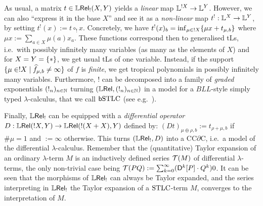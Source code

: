 \documentclass[submission,%
]{eptcs}
\begin{document}
 As usual, a matrix $t\in{\mathbb{L}\mathsf{Rel}_!}(X,Y)$ yields a \emph{linear} map $\mathbb{L}^{!X}\to\mathbb{L}^Y$. However, we can also ``express it in the base $X$'' and see it as a \emph{non-linear} map $t^!:\mathbb{L}^X\to\mathbb{L}^Y$, by setting 
 $t^!(x):=t\circ_! x$.
 Concretely, we have $t^!(x)_b=\inf_{\mu\in !X} \{\mu x+ t_{\mu,b}\}$
 where $\mu x:=\sum_{a\in X} \mu(a)x_a$.
 These functions correspond then to generalised tLs, i.e.\ with possibly infinitely many variables (as many as the elements of $X$) and for $X=Y=\{*\}$, we get usual tLs of one variable.
Instead, if the support $\{\mu\in!X\mid\widehat{f}_{\mu,b}\neq\infty\}$ of $f$ is \emph{finite}, we get %
tropical polynomials in possibly infinitely many variables.
Furthermore, $!$ can be decomposed into a family of \emph{graded} exponentials $(!_n)_{n\in\mathbb{N}}$ turning $(\mathbb{L} \mathsf{Rel},(!_n)_{n\in\mathbb{N}})$ in a model for a $\mathit{BLL}$-style simply typed $\lambda$-calculus, that we call $\mathsf b\mathrm{STLC}$ (see e.g.~\cite{Brunel2014}).

 
Finally, $\mathbb{L} \mathsf{Rel}_!$ can be equipped with a \emph{differential operator} $D:{\mathbb{L} \mathsf{Rel}}(!X,Y)\to {\mathbb{L}\mathsf{Rel}}(!(X+X),Y)$ defined by: $(Dt)_{\mu\oplus\rho,b}:=t_{\rho+\mu,b}$ if $\#\mu=1$ and $:=\infty$ otherwise. %
This turns $(\mathbb{L} \mathsf{Rel}_!,D)$ into a CC$\partial$C, i.e.\ a model of the differential $\lambda$-calculus.
Remember that the (quantitative) Taylor expansion of an ordinary $\lambda$-term $M$ is an inductively defined series $\mathcal{T}(M)$ of differential $\lambda$-terms, the only non-trivial case being $\mathcal{T}(PQ) :=  \sum_{k=0}^{\infty} (\mathsf{D}^{k}[P] \cdot Q^{k})0$.
It can be seen that the morphisms of $\mathbb{L} \mathsf{Rel}_!$ can always be Taylor expanded, and the series interpreting in $\mathbb{L} \mathsf{Rel}_!$ the Taylor expansion of a $\mathrm{STLC}$-term $M$, converges to the interpretation of $M$.

%
%
\end{document}
